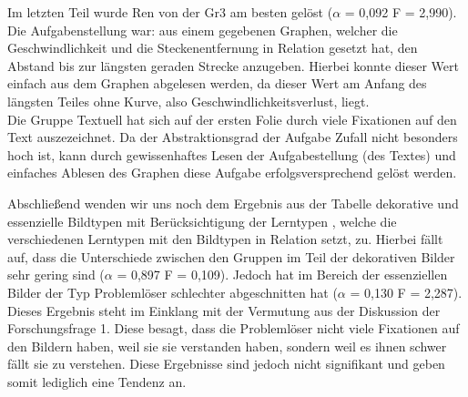 Im letzten Teil wurde \gls{Ren} von der \gls{Gr3} am besten gelöst ($\alpha$ = 0,092 F = 2,990). Die Aufgabenstellung war: aus einem gegebenen Graphen, welcher die Geschwindlichkeit und die Steckenentfernung in Relation gesetzt hat, den Abstand bis zur längsten geraden Strecke anzugeben. Hierbei konnte dieser Wert einfach aus dem Graphen abgelesen werden, da dieser Wert am Anfang des längsten Teiles ohne Kurve, also Geschwindlichkeitsverlust, liegt. \\
Die Gruppe Textuell hat sich auf der ersten Folie durch viele Fixationen auf den Text auszezeichnet. Da der Abstraktionsgrad der Aufgabe Zufall nicht besonders hoch ist, kann durch gewissenhaftes Lesen der Aufgabestellung (des Textes) und einfaches Ablesen des Graphen diese Aufgabe erfolgsversprechend gelöst werden. 


Abschließend wenden wir uns noch dem Ergebnis aus der Tabelle \grqq dekorative und essenzielle Bildtypen mit Berücksichtigung der Lerntypen \grqq , welche die verschiedenen Lerntypen mit den Bildtypen in Relation setzt, zu. Hierbei fällt auf, dass die Unterschiede zwischen den Gruppen im Teil der dekorativen Bilder sehr gering sind ($\alpha$ = 0,897 F = 0,109). Jedoch hat im Bereich der essenziellen Bilder der Typ Problemlöser schlechter abgeschnitten hat ($\alpha$ = 0,130 F = 2,287).\\
Dieses Ergebnis steht im Einklang mit der Vermutung aus der Diskussion der Forschungsfrage 1. Diese besagt, dass die Problemlöser nicht viele Fixationen auf den Bildern haben, weil sie sie verstanden haben, sondern weil es ihnen schwer fällt sie zu verstehen. Diese Ergebnisse sind jedoch nicht signifikant und geben somit lediglich eine Tendenz an. 
